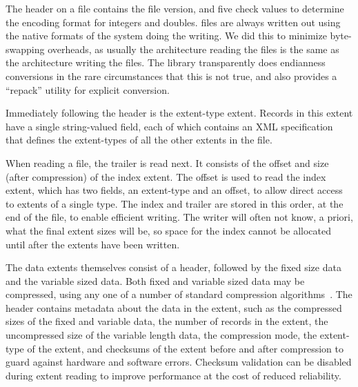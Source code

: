 The header on a \DataSeries{} file contains the \DataSeries{} file version,
and five check values 
to determine the encoding format for integers and doubles.
\DataSeries{} files
are always written out using the native formats of the system doing
the writing. We did this to minimize byte-swapping overheads,
as usually the architecture reading the files is the same 
as the architecture writing the files.
The library transparently does endianness conversions in the 
rare circumstances that this is not true, and also provides a ``repack''
utility for explicit conversion.

Immediately following the header is the extent-type extent. Records in
this extent have a single string-valued field, each of which 
contains an XML specification that defines the extent-types of all the 
other extents in the file.  

When reading a \DataSeries{} file, the trailer is read next.  It consists
of the offset and size (after compression) of the index extent.  The
offset is used to read the index extent, which has two fields, an
extent-type and an offset, to allow direct access to extents of a single type.
The index and trailer are
stored in this order, at the end of the file, to enable efficient
writing. The writer will often not know, a priori, what the final
extent sizes will be, so space for the index cannot be allocated until
after the extents have been written.

The data extents themselves consist of a header, followed by the 
fixed size data
and the variable sized data.  Both fixed and variable sized data may be
compressed, using any one of a number of standard compression
algorithms~\cite{GZIP,BZIP,LZF,LZO}.  The header contains metadata
about the data in the extent, such as the compressed sizes of the
fixed and variable data, the number of records in the extent, the
uncompressed size of the variable length data, the compression mode,
the extent-type of the extent, and checksums of the extent before and
after compression to guard against hardware and software errors.
Checksum validation can be disabled during extent reading to improve
performance at the cost of reduced reliability.

